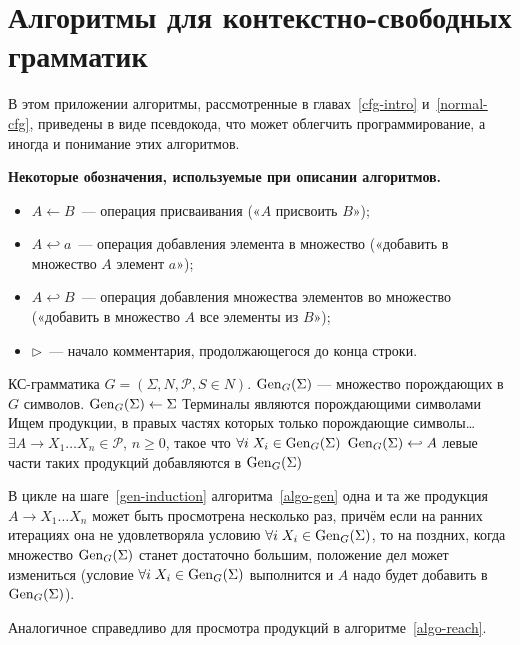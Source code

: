 \renewcommand{\theAlgoEnv}{\Alph{chapter}.\arabic{AlgoEnv}}

\chapter{Алгоритмы для контекстно-свободных грамматик}

В этом приложении алгоритмы, рассмотренные в
главах~\ref{cfg-intro} и~\ref{normal-cfg}, приведены в виде
псевдокода, что может облегчить программирование, а иногда и
понимание этих алгоритмов.

\textbf{Некоторые обозначения, используемые при описании алгоритмов.}
\begin{itemize}
    \item
${A \gets B}$~— операция присваивания («$A$ присвоить $B$»);

    \item
$A \hookleftarrow a$~— операция добавления элемента в множество («добавить в
множество $A$ элемент $a$»);

    \item
$A \hookleftarrow B$~— операция добавления
множества элементов во множество («добавить в множество $A$ все элементы из
$B$»);

    \item
${\rhd}$~— начало комментария, продолжающегося до конца строки.
\end{itemize}

{\label{algo-gen}КС-грамматика $G=(\Sigma, N, \mathcal P, S \in N)$.}
{$\operatorname{Gen}_G(\Sigma)$  — множество порождающих в $G$ символов.}
{%
\li $\operatorname{Gen}_G(\Sigma) \gets \Sigma$ \Comment Терминалы являются порождающими
символами
\zi\Comment Ищем продукции, в правых частях которых только порождающие символы\ldots
\li \While $\exists A \to X_1 \ldots X_n \in \mathcal P$, $n \geqslant 0$,
такое что $\forall i \; X_i \in \operatorname{Gen}_G(\Sigma)$  \label{gen-induction}
\zi     \Do
        $\operatorname{Gen}_G(\Sigma) \hookleftarrow A$ \Comment левые части таких
        продукций добавляются в $\operatorname{Gen}_G(\Sigma)$
        \End
}

\begin{myremark}
В цикле на шаге~\ref{gen-induction} алгоритма~\ref{algo-gen}
одна и та же продукция $A \to X_1 \ldots X_n$
может быть просмотрена несколько раз, причём если на ранних итерациях она не
удовлетворяла условию $\forall i \; X_i \in \operatorname{Gen}_G(\Sigma)$, то на поздних,
когда множество $\operatorname{Gen}_G(\Sigma)$ станет достаточно большим, положение дел может
измениться (условие $\forall i \; X_i \in \operatorname{Gen}_G(\Sigma)$ выполнится и $A$ надо
будет добавить в $\operatorname{Gen}_G(\Sigma)$).

Аналогичное справедливо для просмотра продукций в алгоритме~\ref{algo-reach}.
\end{myremark}

